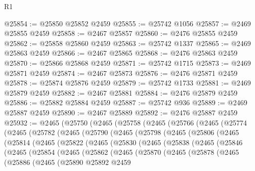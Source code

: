 \begin{lexlean}{R1}
\begin{coremodule}
@25854 := @25850 @25852 @2459
@25855 := @25742 @1056
@25857 := @2469 @25855 @2459
@25858 := @2467 @25857
@25860 := @2476 @25855 @2459
@25862 := @25858 @25860 @2459
@25863 := @25742 @1337
@25865 := @2469 @25863 @2459
@25866 := @2467 @25865
@25868 := @2476 @25863 @2459
@25870 := @25866 @25868 @2459
@25871 := @25742 @1715
@25873 := @2469 @25871 @2459
@25874 := @2467 @25873
@25876 := @2476 @25871 @2459
@25878 := @25874 @25876 @2459
@25879 := @25742 @1733
@25881 := @2469 @25879 @2459
@25882 := @2467 @25881
@25884 := @2476 @25879 @2459
@25886 := @25882 @25884 @2459
@25887 := @25742 @936
@25889 := @2469 @25887 @2459
@25890 := @2467 @25889
@25892 := @2476 @25887 @2459
@25932 := @2465
    (@25750
      (@2465
        (@25758
          (@2465
            (@25766
              (@2465
                (@25774
                  (@2465
                    (@25782
                      (@2465
                        (@25790
                          (@2465
                            (@25798
                              (@2465
                                (@25806
                                  (@2465
                                    (@25814
                                      (@2465
                                        (@25822
                                          (@2465
                                            (@25830
                                              (@2465
                                                (@25838
                                                  (@2465
                                                    (@25846
                                                      (@2465
                                                        (@25854
                                                          (@2465
                                                            (@25862
                                                              (@2465
                                                                (@25870
                                                                  (@2465
                                                                    (@25878
                                                                      (@2465
                                                                        (@25886
                                                                          (@2465
                                                                            (@25890
                                                                              @25892
                                                                              @2459

\end{coremodule}
\end{lexlean}
